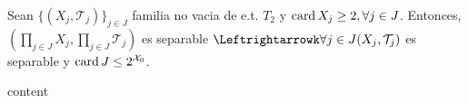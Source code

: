 \begin{prop}
  Sean $\{ ( X_{j}, \mathcal{T}_{j} ) \}_{j \in J}$ familia no vacia de e.t. $T_{2}$ y $\operatorname{card} X_{j} \geq 2, \forall j \in J$. Entonces, $( \prod_{j \in J} X_{j}, \prod_{j \in J} \mathcal{T}_{j} )$ es separable $ \Leftrightarrowk \forall j \in J ( X_{j}, \mathcal{T}_{j} )$ es separable y $\operatorname{card} J \leq 2^{\mathcal{X}_{0}}$.
\end{prop}

\begin{dem}
  content
\end{dem}
